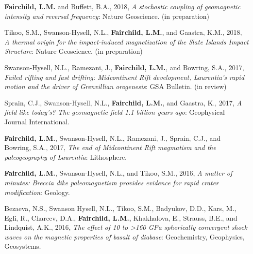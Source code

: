 \documentclass[11pt,a4paper,sans]{moderncv}        %
\begin{document}
\begin{etaremune}

\vspace{6pt}

\item{\textbf{Fairchild, L.M.} and Buffett, B.A., 2018, \textit{A stochastic coupling of geomagnetic intensity and reversal frequency}: Nature Geoscience. (in preparation)}

\vspace{3pt}

\item{Tikoo, S.M., Swanson-Hysell, N.L., \textbf{Fairchild, L.M.}, and Gaastra, K.M., 2018, \textit{A thermal origin for the impact-induced magnetization of the Slate Islands Impact Structure}: Nature Geoscience. (in preparation)}

\vspace{3pt}

\item{Swanson-Hysell, N.L., Ramezani, J., \textbf{Fairchild, L.M.}, and Bowring, S.A., 2017, \textit{Failed rifting and fast drifting: Midcontinent Rift development, Laurentia's rapid motion and the driver of Grenvillian orogenesis}: GSA Bulletin. (in review)}

\vspace{3pt}

\item{Sprain, C.J., Swanson-Hysell, N.L., \textbf{Fairchild, L.M.}, and Gaastra, K., 2017, \textit{A field like today's? The geomagnetic field 1.1 billion years ago}: Geophysical Journal International.}

\vspace{3pt}

\item{\textbf{Fairchild, L.M.}, Swanson-Hysell, N.L., Ramezani, J., Sprain, C.J., and Bowring, S.A., 2017, \textit{The end of Midcontinent Rift magmatism and the paleogeography of Laurentia}: Lithosphere.}

\vspace{3pt}

\item{\textbf{Fairchild, L.M.}, Swanson-Hysell, N.L., and Tikoo, S.M., 2016, \textit{A matter of minutes: Breccia dike paleomagnetism provides evidence for rapid crater modification}: Geology.}

\vspace{3pt}

\item{Bezaeva, N.S., Swanson Hysell, N.L., Tikoo, S.M., Badyukov, D.D., Kars, M., Egli, R., Chareev, D.A., \textbf{Fairchild, L.M.}, Khakhalova, E., Strauss, B.E., and Lindquist, A.K., 2016, \textit{The effect of 10 to >160 GPa spherically convergent shock waves on the magnetic properties of basalt of diabase}: Geochemistry, Geophysics, Geosystems.}


\end{etaremune}
\end{document}
